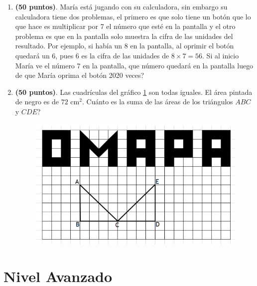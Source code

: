 \begin{enumerate}
				

	\item \textbf{(50 puntos)}. María está jugando con su calculadora, sin embargo su calculadora tiene dos problemas, el primero es que solo tiene un botón que lo que hace es multiplicar por 7 el número que esté en la pantalla y el otro problema es que en la pantalla solo muestra la cifra de las unidades del resultado. Por ejemplo, si había un 8 en la pantalla, al oprimir el botón quedará un 6, pues 6 es la cifra de las unidades de $8\times 7 =56$. Si al inicio María ve el número 7 en la pantalla, que número quedará en la pantalla luego de que María oprima el botón 2020 veces?
			
		
	\item \textbf{(50 puntos)}. Las cuadrículas del gráfico \ref{fig:omapa} son todas iguales. El área pintada de negro es de $72{\text{ cm}}^2$. Cuánto es la suma de las áreas de los triángulos $ABC$ y $CDE$?
	\begin{figure}[H]
		\centering
		\includegraphics[width=0.7\linewidth]{2020_10_31/imgs/omapa}
		\label{fig:omapa}
	\end{figure}
	
\end{enumerate}




\newpage
\section{Nivel Avanzado}\label{avanzado:2020_10_31}

